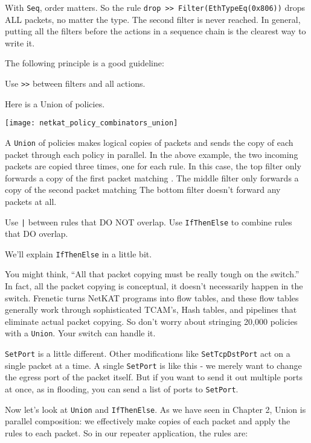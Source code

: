 With \texttt{Seq}, order matters.  So the rule \texttt{drop >> Filter(EthTypeEq(0x806))} 
drops ALL packets, no matter the type.  
The second filter is never reached.  
In general, putting all the filters before the actions in a sequence chain is the clearest way to write it.

The following principle is a good guideline:  

\begin{principle}
Use \texttt{>>} between filters and all actions.
\end{principle}

Here is a Union of policies.

\texttt{[image: netkat\_policy\_combinators\_union]}

A \texttt{Union} of policies makes logical copies of packets and sends the copy of each packet
through each policy in parallel.  In the above example, the two incoming packets are copied three times, one
for each rule.  In this case, the top filter only forwards a copy of the first packet matching .
The middle filter only forwards a copy of the second packet  matching 
The bottom filter doesn't forward any packets at all.  

\begin{principle}
Use \texttt{|} between rules that DO NOT overlap.
Use \texttt{IfThenElse} to combine rules that DO overlap. 
\end{principle}

We'll explain \texttt{IfThenElse} in a little bit.  

You might think, ``All that packet copying must be really tough on the switch.''  In fact, all the 
packet copying is conceptual, it doesn't necessarily happen in the switch.  Frenetic turns NetKAT
programs into flow tables, and these flow tables generally work through sophisticated TCAM's, Hash tables,
and pipelines that eliminate actual packet copying.  So don't worry about stringing 20,000 policies
with a \texttt{Union}.  Your switch can handle it.   

\texttt{SetPort} is a little different.  Other modifications like \texttt{SetTcpDstPort} act on a single packet at a time.
A single \texttt{SetPort} is like this - we merely want to change the egress port of the packet itself.  But if 
you want to send it out multiple ports at once, as in flooding, you can send a list of ports to \texttt{SetPort}.

Now let's look at \texttt{Union} and \texttt{IfThenElse}.  
As we have seen in Chapter 2, Union is parallel composition:
we effectively make copies of each packet and apply the rules to each packet.  So in our 
repeater application, the rules are:

